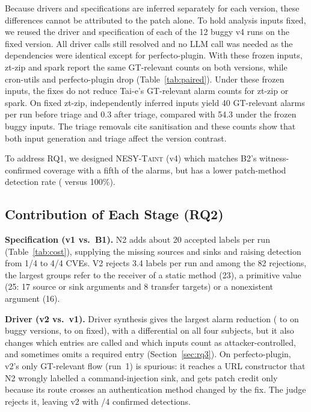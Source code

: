 \documentclass[sigconf]{acmart}
\newcommand{\tool}{\textsc{NESY-Taint}}
\begin{document}
Because drivers and specifications are inferred separately for each version, these differences cannot be attributed to the patch alone. To hold analysis inputs fixed, we reused the driver and specification of each of the 12 buggy v4 runs on the fixed version. All driver calls still resolved and no LLM call was needed as the dependencies were identical except for perfecto-plugin. With these frozen inputs, zt-zip and spark report the same GT-relevant counts on both versions, while cron-utils and perfecto-plugin drop (Table~\ref{tab:paired}). Under these frozen inputs, the fixes do not reduce Tai-e's GT-relevant alarm counts for zt-zip or spark. On fixed zt-zip, independently inferred inputs yield 40 GT-relevant alarms per run before triage and 0.3 after triage, compared with 54.3 under the frozen buggy inputs. The triage removals cite sanitisation and these counts show that both input generation and triage affect the version contrast.

To address RQ1, we designed \tool{} (v4) which matches B2's witness-confirmed coverage with a fifth of the alarms, but has a lower patch-method detection rate (\VFourRate{} versus 100\%).

\subsection{Contribution of Each Stage (RQ2)}
\begin{table}[t]
\caption{Stage effects, LLM usage and stability. Spec/Rej.: N2 labels accepted/rejected per run. Rem./Rem.GT: triage removals per run, all and GT-relevant, summed over the 8 subject versions. V3: removals vetoed by the validator or the trusted-sink rule, on the same basis. Calls: total over 24 runs. Jacc.: mean pairwise Jaccard similarity of alarm sets across the 3 runs. B1 and B2 make no LLM calls.}
\label{tab:cost}
\small\setlength{\tabcolsep}{3.0pt}

\end{table}

\textbf{Specification (v1 vs.\ B1).} N2 adds about 20 accepted labels per run (Table~\ref{tab:cost}), supplying the missing sources and sinks and raising detection from 1/4 to 4/4 CVEs. V2 rejects 3.4 labels per run and among the 82 rejections, the largest groups refer to the receiver of a static method (23), a primitive value (25: 17 source or sink arguments and 8 transfer targets) or a nonexistent argument (16).

\textbf{Driver (v2 vs.\ v1).} Driver synthesis gives the largest alarm reduction (\VOneAlarms{} to \VTwoAlarms{} on buggy versions, \VOneAlarmsFixed{} to \VTwoAlarmsFixed{} on fixed), with a differential on all four subjects, but it also changes which entries are called and which inputs count as attacker-controlled, and sometimes omits a required entry (Section~\ref{sec:rq3}). On perfecto-plugin, v2's only GT-relevant flow (run~1) is spurious: it reaches a URL constructor that N2 wrongly labelled a command-injection sink, and gets patch credit only because its route crosses an authentication method changed by the fix. The judge rejects it, leaving v2 with \VTwoConf{}/4 confirmed detections.
\end{document}
